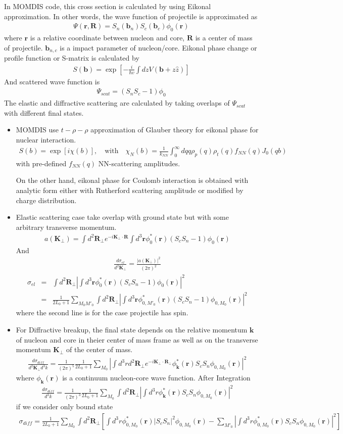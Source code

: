 \documentclass[11pt]{book}
\def\bm{\boldsymbol}
\def\vk{{\bm k}}
\def\vr{{\bm r}}
\def\vR{{\bm R}}
\newcommand{\bea}{\begin{eqnarray}}
\newcommand{\eea}{\end{eqnarray}}
\newcommand{\no}{\nonumber \\}
\begin{document}
In MOMDIS code, this cross section is calculated by using Eikonal approximation. 
In other words, the wave function of projectile is approximated as
\bea 
\Psi(\vr,\vR)=S_n({\bm b}_n)S_c({\bm b}_c)\phi_0(\vr)
\eea 
where $\vr$ is a relative coordinate between 
nucleon and core, $\vR$ is a center of mass of projectile.
${\bm b}_{n,c}$ is a impact parameter of nucleon/core. 
Eikonal phase change or profile function or S-matrix is
calculated by 
\bea 
S({\bm b})=\exp\left[-\frac{i}{\hbar v}\int dz V({\bm b}+z\hat{z}) \right]
\eea 
And scattered wave function is
\bea 
\Psi_{scat}=(S_n S_c -1)\phi_0 
\eea 
The elastic and diffractive scattering are calculated by taking
overlaps of $\Psi_{scat}$ with different final states.

\begin{itemize} 
	\item MOMDIS use $t-\rho-\rho$ approximation
	of Glauber theory for eikonal phase for nuclear 
	interaction. 
	\bea 
	S(b)=\exp[i\chi(b)],\quad \mbox{with} \quad 
	\chi_N(b)=\frac{1}{k_{NN}}\int_0^\infty dq q \rho_p(q) \rho_t(q) f_{NN}(q) J_0(qb)
	\eea 
	with pre-defined $f_{NN}(q)$ NN-scattering amplitudes.
	
	On the other hand, eikonal phase for Coulomb
	interaction is obtained with analytic form
	either with Rutherford scattering amplitude or 
	modified by charge distribution. 
	
	\item Elastic scattering case take overlap with ground state
but with some arbitrary transverse momentum. 
\bea 
a({\bm K}_\perp)
=\int d^2\vR_\perp e^{-i{\bm K}_\perp\cdot\vR}
 \int d^3\vr \phi^*_0(\vr)(S_c S_n-1)\phi_0(\vr) 
\eea 
And
\bea 
\frac{d\sigma_{el}}{d^2{\bm K}_\perp}=\frac{|a({\bm K}_\perp)|^2}{(2\pi)^2}
\eea 
\bea 
\sigma_{el}&=&\int d^2 {\bm R}_\perp| \int d^3\vr \phi^*_0(\vr)(S_c S_n-1)\phi_0(\vr)|^2 \no 
        &=&\frac{1}{2L_0+1}\sum_{M_0 M'_0}
            \int d^2 {\bm R}_\perp| \int d^3\vr \phi^*_{0,M'_0}(\vr)(S_c S_n-1)
            \phi_{0,M_0}(\vr)|^2
\eea 
where the second line is for the case 
projectile has spin. 

\item For Diffractive breakup, the final state depends
 on the relative momentum $\vk$ of nucleon and core
 in theier center of mass frame as well as on the transverse momentum ${\bm K}_\perp$ of the center of mass.
 \bea 
 \frac{d\sigma_{diff}}{d^2{\bm K}_\perp d^3 k}
 =\frac{1}{(2\pi)^5}\frac{1}{2L_0+1}\sum_{M_0}
  |\int d^3r d^2{\vR}_\perp 
   e^{-i{\bm K}_\perp\cdot{\vR}_\perp}
   \phi_{\vk}^*(\vr) S_c S_n \phi_{0,M_0}(\vr)|^2
 \eea 
 where $\phi_\vk(\vr)$ is a continuum nucleon-core wave function. 
 After Integration 
 \bea 
 \frac{d\sigma_{diff}}{d^3k}
 =\frac{1}{(2\pi)^3}\frac{1}{2L_0+1}\sum_{M_0} 
 \int d^2\vR_\perp| \int d^3 r \phi_\vk^*(\vr) S_c S_n
 \phi_{0,M_0}(\vr)|^2
 \eea
 if we consider only bound state 
 \bea 
 \sigma_{diff} = 
   \frac{1}{2L_0+1}\sum_{M_0} 
   \int d^2\vR_\perp
   \left[ \int d^3 r \phi_{0,M_0}^*(\vr) |S_c S_n|^2
   \phi_{0,M_0}(\vr)
   -\sum_{M'_0} | \int d^3 r \phi_{0,M_0}^*(\vr) S_c S_n
   \phi_{0,M_0}(\vr)|^2
   \right] 
 \eea 
 

\end{itemize}
\end{document}
